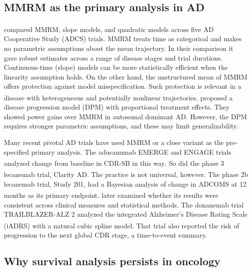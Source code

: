 \documentclass[
  11pt,
]{article}
\begin{document}
\subsection{MMRM as the primary analysis in AD}\label{mmrm-as-the-primary-analysis-in-ad}

\textsuperscript{} compared MMRM, slope models, and
quadratic models across five AD Cooperative Study (ADCS)
trials. MMRM treats time as categorical and makes no
parametric assumptions about the mean trajectory. In their
comparison it gave robust estimates across a range of
disease stages and trial durations. Continuous-time
(slope) models can be more statistically efficient when
the linearity assumption holds. On the other hand, the
unstructured mean of MMRM offers protection against model
misspecification. Such protection is relevant in a disease
with heterogeneous and potentially nonlinear trajectories.\textsuperscript{} proposed a disease progression model (DPM)
with proportional treatment effects. They showed power
gains over MMRM in autosomal dominant AD. However, the DPM
requires stronger parametric assumptions, and these may
limit generalizability.

Many recent pivotal AD trials have used MMRM or a close
variant as the pre-specified primary analysis. The
aducanumab EMERGE and ENGAGE trials analyzed change from
baseline in CDR-SB in this way\textsuperscript{}. So did the phase 3
lecanemab trial, Clarity AD\textsuperscript{}.
The practice is not universal, however. The phase 2b
lecanemab trial, Study 201, had a Bayesian analysis of
change in ADCOMS at 12 months as its primary endpoint\textsuperscript{}.\textsuperscript{} later
examined whether its results were consistent across
clinical measures and statistical methods. The donanemab
trial TRAILBLAZER-ALZ 2 analyzed the integrated Alzheimer's
Disease Rating Scale (iADRS) with a natural cubic spline
model\textsuperscript{}. That trial also reported the
risk of progression to the next global CDR stage, a
time-to-event summary.

\subsection{Why survival analysis persists in oncology}\label{why-survival-analysis-persists-in-oncology}
\end{document}
